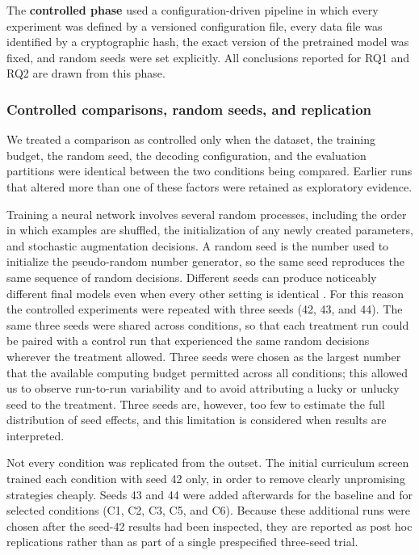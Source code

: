 The \textbf{controlled phase} used a configuration-driven pipeline in which every
experiment was defined by a versioned configuration file, every data file was
identified by a cryptographic hash, the exact version of the pretrained model was
fixed, and random seeds were set explicitly. All conclusions reported for RQ1 and
RQ2 are drawn from this phase.

\subsubsection{Controlled comparisons, random seeds, and replication}
\label{sec:seeds}

We treated a comparison as controlled only when the dataset, the training budget,
the random seed, the decoding configuration, and the evaluation partitions were
identical between the two conditions being compared. Earlier runs that altered
more than one of these factors were retained as exploratory evidence.

Training a neural network involves several random processes, including the order
in which examples are shuffled, the initialization of any newly created
parameters, and stochastic augmentation decisions. A random seed is the number
used to initialize the pseudo-random number generator, so the same seed
reproduces the same sequence of random decisions. Different seeds can produce
noticeably different final models even when every other setting is identical
\citep{Reimers2017, Dodge2020}. For this reason the controlled experiments were
repeated with three seeds (42, 43, and 44). The same three seeds were shared
across conditions, so that each treatment run could be paired with a control run
that experienced the same random decisions wherever the treatment allowed. Three
seeds were chosen as the largest number that the available computing budget
permitted across all conditions; this allowed us to observe run-to-run
variability and to avoid attributing a lucky or unlucky seed to the treatment.
Three seeds are, however, too few to estimate the full distribution of seed
effects, and this limitation is considered when results are interpreted.

Not every condition was replicated from the outset. The initial curriculum
screen trained each condition with seed 42 only, in order to remove clearly
unpromising strategies cheaply. Seeds 43 and 44 were added afterwards for the
baseline and for selected conditions (C1, C2, C3, C5, and C6). Because these
additional runs were chosen after the seed-42 results had been inspected, they
are reported as post hoc replications rather than as part of a single
prespecified three-seed trial.

